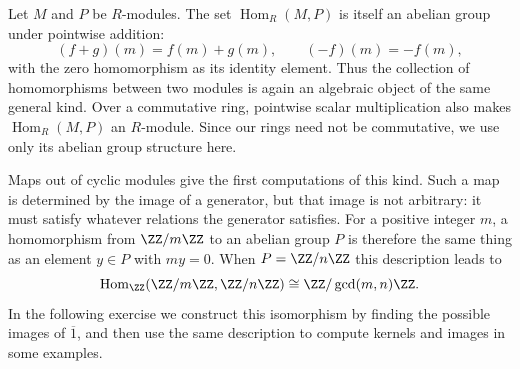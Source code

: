 \documentclass[12pt,reqno]{amsart}
\providecommand{\Hom}{\operatorname{Hom}}
\begin{document}
Let $M$ and $P$ be $R$-modules. The set $\Hom_R(M,P)$ is itself an abelian group under pointwise addition:
\[
 (f+g)(m)=f(m)+g(m),\qquad (-f)(m)=-f(m),
\]
with the zero homomorphism as its identity element. Thus the collection of homomorphisms between two modules is again an algebraic object of the same general kind. Over a commutative ring, pointwise scalar multiplication also makes $\Hom_R(M,P)$ an $R$-module. Since our rings need not be commutative, we use only its abelian group structure here.

Maps out of cyclic modules give the first computations of this kind. Such a map is determined by the image of a generator, but that image is not arbitrary: it must satisfy whatever relations the generator satisfies. For a positive integer $m$, a homomorphism from $\ZZ/m\ZZ$ to an abelian group $P$ is therefore the same thing as an element $y\in P$ with $my=0$. When $P=\ZZ/n\ZZ$ this description leads to
\[
 \Hom_{\ZZ}(\ZZ/m\ZZ,\ZZ/n\ZZ)\cong\ZZ/\gcd(m,n)\ZZ.
\]
In the following exercise we construct this isomorphism by finding the possible images of $\overline1$, and then use the same description to compute kernels and images in some examples.

\hrulefill
\end{document}
